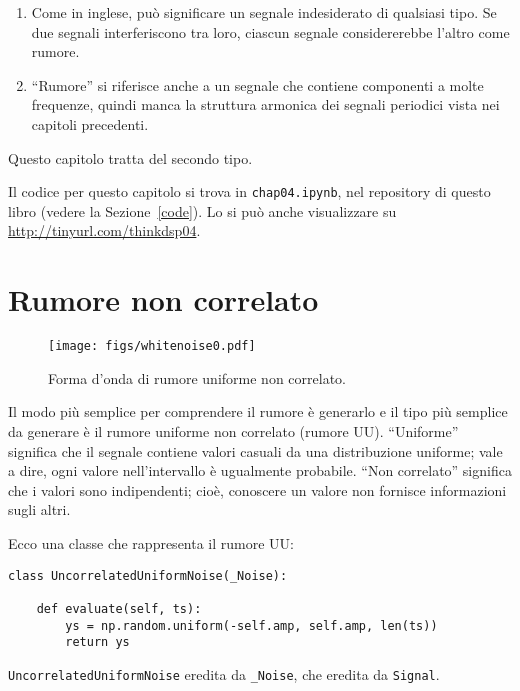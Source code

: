 \documentclass[12pt,a4paper]{book}
\begin{document}
\begin{enumerate} 

\item Come in inglese, può significare un segnale indesiderato di qualsiasi tipo. Se due segnali interferiscono tra loro, ciascun segnale considererebbe l'altro come rumore.

\item ``Rumore'' si riferisce anche a un segnale che contiene componenti a molte frequenze, quindi manca la struttura armonica dei segnali periodici vista nei capitoli precedenti.

\end{enumerate} 

Questo capitolo tratta del secondo tipo.

Il codice per questo capitolo si trova in {\tt chap04.ipynb}, nel repository di questo libro (vedere la Sezione~\ref{code}). Lo si può anche visualizzare su \url{http://tinyurl.com/thinkdsp04}.

\section{Rumore non correlato} 

\begin{figure} 

\centerline{\texttt{[image: figs/whitenoise0.pdf]}} \caption{Forma d'onda di rumore uniforme non correlato.} \label{fig.whitenoise0} \end{figure} 

Il modo più semplice per comprendere il rumore è generarlo e il tipo più semplice da generare è il rumore uniforme non correlato (rumore UU). ``Uniforme'' significa che il segnale contiene valori casuali da una distribuzione uniforme; vale a dire, ogni valore nell'intervallo è ugualmente probabile. ``Non correlato'' significa che i valori sono indipendenti; cioè, conoscere un valore non fornisce informazioni sugli altri.

Ecco una classe che rappresenta il rumore UU:

\begin{verbatim} 
class UncorrelatedUniformNoise(_Noise):

    def evaluate(self, ts):
        ys = np.random.uniform(-self.amp, self.amp, len(ts))
        return ys
 \end{verbatim} 

{\tt UncorrelatedUniformNoise} eredita da \verb"_Noise", che eredita da {\tt Signal}.
\end{document}
